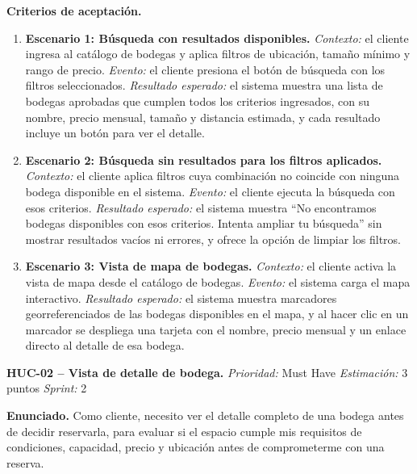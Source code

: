 \textbf{Criterios de aceptación.}
\begin{enumerate}
\item \textbf{Escenario 1: Búsqueda con resultados disponibles.} \textit{Contexto:} el cliente ingresa al catálogo de bodegas y aplica filtros de ubicación, tamaño mínimo y rango de precio. \textit{Evento:} el cliente presiona el botón de búsqueda con los filtros seleccionados. \textit{Resultado esperado:} el sistema muestra una lista de bodegas aprobadas que cumplen todos los criterios ingresados, con su nombre, precio mensual, tamaño y distancia estimada, y cada resultado incluye un botón para ver el detalle.
\item \textbf{Escenario 2: Búsqueda sin resultados para los filtros aplicados.} \textit{Contexto:} el cliente aplica filtros cuya combinación no coincide con ninguna bodega disponible en el sistema. \textit{Evento:} el cliente ejecuta la búsqueda con esos criterios. \textit{Resultado esperado:} el sistema muestra ``No encontramos bodegas disponibles con esos criterios. Intenta ampliar tu búsqueda'' sin mostrar resultados vacíos ni errores, y ofrece la opción de limpiar los filtros.
\item \textbf{Escenario 3: Vista de mapa de bodegas.} \textit{Contexto:} el cliente activa la vista de mapa desde el catálogo de bodegas. \textit{Evento:} el sistema carga el mapa interactivo. \textit{Resultado esperado:} el sistema muestra marcadores georreferenciados de las bodegas disponibles en el mapa, y al hacer clic en un marcador se despliega una tarjeta con el nombre, precio mensual y un enlace directo al detalle de esa bodega.
\end{enumerate}

\textbf{HUC-02 -- Vista de detalle de bodega.} \label{req:HUC-02}
\textit{Prioridad:} Must Have \quad \textit{Estimación:} 3 puntos \quad \textit{Sprint:} 2

\textbf{Enunciado.} Como cliente, necesito ver el detalle completo de una bodega antes de decidir reservarla, para evaluar si el espacio cumple mis requisitos de condiciones, capacidad, precio y ubicación antes de comprometerme con una reserva.

